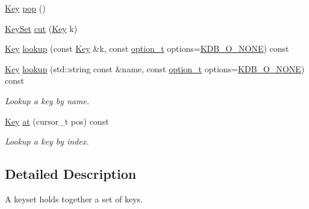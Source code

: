 \begin{DoxyCompactItemize}
\hyperlink{classkdb_1_1Key}{Key} \hyperlink{classkdb_1_1KeySet_a7f207457a1c12633a1a5301a3a1bbaed}{pop} ()
\begin{DoxyCompactList}\small\item\em \end{DoxyCompactList}\item 
\hyperlink{classkdb_1_1KeySet}{Key\-Set} \hyperlink{classkdb_1_1KeySet_ab283da798a7670d5c3f0e1a5b821e666}{cut} (\hyperlink{classkdb_1_1Key}{Key} k)
\begin{DoxyCompactList}\small\item\em \end{DoxyCompactList}\item 
\hyperlink{classkdb_1_1Key}{Key} \hyperlink{classkdb_1_1KeySet_a816e7468abe296f8352e090738c215cc}{lookup} (const \hyperlink{classkdb_1_1Key}{Key} \&k, const \hyperlink{group__keyset_ga98a3d6a4016c9dad9cbd1a99a9c2a45a}{option\-\_\-t} options=\hyperlink{group__keyset_gga98a3d6a4016c9dad9cbd1a99a9c2a45aa00738455e0ae843c8720809d8287f370}{K\-D\-B\-\_\-\-O\-\_\-\-N\-O\-N\-E}) const 
\begin{DoxyCompactList}\small\item\em \end{DoxyCompactList}\item 
\hyperlink{classkdb_1_1Key}{Key} \hyperlink{classkdb_1_1KeySet_a2bb4b6f5c46eb54c4f495832672e1e98}{lookup} (std\-::string const \&name, const \hyperlink{group__keyset_ga98a3d6a4016c9dad9cbd1a99a9c2a45a}{option\-\_\-t} options=\hyperlink{group__keyset_gga98a3d6a4016c9dad9cbd1a99a9c2a45aa00738455e0ae843c8720809d8287f370}{K\-D\-B\-\_\-\-O\-\_\-\-N\-O\-N\-E}) const 
\begin{DoxyCompactList}\small\item\em Lookup a key by name. \end{DoxyCompactList}\item 
\hyperlink{classkdb_1_1Key}{Key} \hyperlink{classkdb_1_1KeySet_ad4aa72767cf702066e804ef054fc7e5b}{at} (cursor\-\_\-t pos) const 
\begin{DoxyCompactList}\small\item\em Lookup a key by index. \end{DoxyCompactList}\end{DoxyCompactItemize}


\subsection{Detailed Description}
A keyset holds together a set of keys. 

